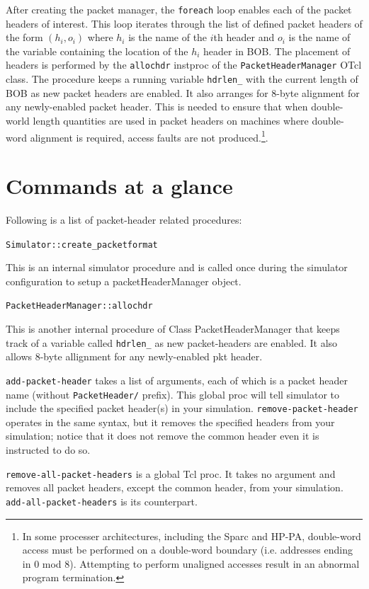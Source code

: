 \label{sec:configpacket}
After creating the packet manager, the {\tt foreach}
loop enables each of the packet headers of interest.
This loop iterates through the list of defined
packet headers of the form
$(h_i, o_i)$ where $h_i$ is the name of the  $i$th header
and $o_i$ is the name of the variable containing the
location of the $h_i$ header in BOB.
The placement of headers is performed by the {\tt allochdr}
instproc of the {\tt PacketHeaderManager} OTcl class.
The procedure keeps a running variable {\tt hdrlen\_} with
the current length of BOB as new packet headers are enabled.
It also arranges for 8-byte alignment for any newly-enabled packet
header.
This is needed to ensure that when double-world length quantities
are used in packet headers on machines where double-word alignment
is required, access faults are not produced.\footnote{In
some processer architectures, including the
Sparc and HP-PA, double-word access must be performed on a double-word
boundary (i.e. addresses ending in 0 mod 8).  Attempting to perform
unaligned accesses result in an abnormal program termination.}.


\section{Commands at a glance}
\label{sec:pktcommand}

Following is a list of packet-header related procedures:
\begin{flushleft}
{\tt Simulator::create\_packetformat}

This is an internal simulator procedure and is called once during the simulator
configuration to setup a packetHeaderManager object.

{\tt PacketHeaderManager::allochdr}

This is another internal procedure of Class PacketHeaderManager that
keeps track 
of a variable called {\tt hdrlen\_} as new packet-headers are
enabled. 
It also allows 8-byte allignment for any newly-enabled pkt header.

{\tt add-packet-header}
takes a list of arguments, each of which is a packet header name
(without {\tt PacketHeader/} prefix). This global proc will tell
simulator to include the specified packet header(s) in your
simulation. 
{\tt remove-packet-header} operates in the same syntax, but it
removes the specified headers from your simulation; notice that it
does not remove the common header even it is instructed to do so.

{\tt remove-all-packet-headers} is a global Tcl proc. It takes no
argument and removes all packet headers, except the common header,
from your simulation. {\tt add-all-packet-headers} is its
counterpart. 

\end{flushleft}
\endinput

